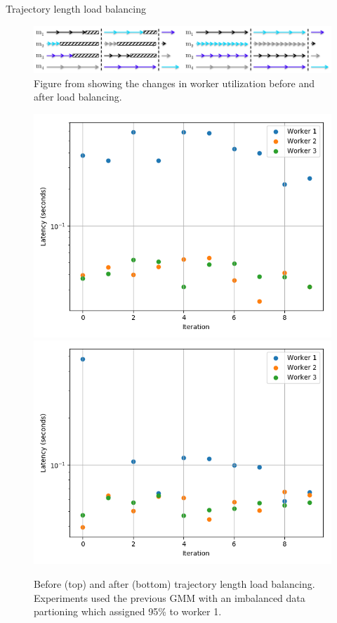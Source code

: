 \documentclass[final]{beamer}
\newlength{\onecolwid}
\newlength{\twocolwid}
\begin{document}
\begin{frame}[t]
\begin{columns}[t]
\begin{column}{\twocolwid}
\begin{columns}[t,totalwidth=\twocolwid]
\begin{column}{\onecolwid}
\begin{block}{Trajectory length load balancing}

  \begin{figure}[htpb]
    \centering
    \includegraphics[width=1.0\linewidth]{poster-figures/ahn-lb.png}
    \caption{Figure from \cite{ahn2014distributed} showing the changes in worker
      utilization before and after load balancing.}
    \label{fig:ahn-lb}
  \end{figure}

  \begin{figure}
    \includegraphics[width=0.7\linewidth]{poster-figures/load-balancing-none.png}\\
    \includegraphics[width=0.7\linewidth]{poster-figures/load-balancing.png}
    \caption{Before (top) and after (bottom) trajectory length load balancing. Experiments used
      the previous GMM with an imbalanced data partioning which assigned 95\% to worker 1.}
    \label{fig:load-balancing}
  \end{figure}


\end{block}
\end{column}
\end{columns}
\end{column}
\end{columns}
\end{frame}
\end{document}
